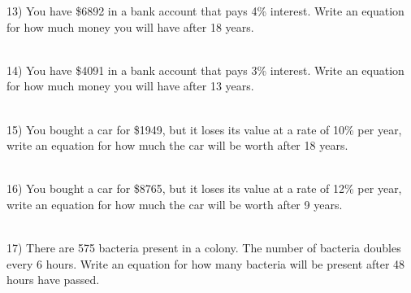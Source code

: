 \documentclass[12pt]{article}
\begin{document}
\begin{minipage}{\textwidth}
\hrulefill








\end{minipage}\begin{minipage}{\textwidth}13) You have \$6892 in a bank account that pays 4\% interest. Write an equation for how much money you will have after 18 years. \\ \\
 

\hrulefill





\end{minipage}\begin{minipage}{\textwidth}14) You have \$4091 in a bank account that pays 3\% interest. Write an equation for how much money you will have after 13 years. \\ \\
 

\hrulefill







\end{minipage}\begin{minipage}{\textwidth}15) You bought a car for \$1949, but it loses its value at a rate of 10\% per year, write an equation for how much the car will be worth after 18 years. \\ \\
 

\hrulefill




\end{minipage}\begin{minipage}{\textwidth}16) You bought a car for \$8765, but it loses its value at a rate of 12\% per year, write an equation for how much the car will be worth after 9 years. \\ \\
 

\hrulefill







\end{minipage}\begin{minipage}{\textwidth}17) There are 575 bacteria present in a colony. The number of bacteria doubles every 6 hours. Write an equation for how many bacteria will be present after 48 hours have passed. \\ \\
 


\end{minipage}
\end{document}

